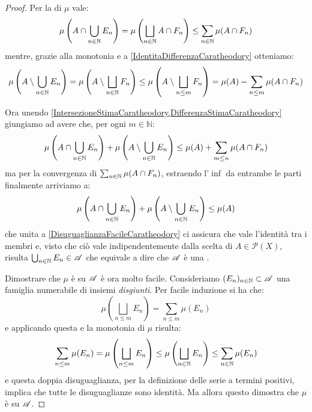 \begin{proof}
	Per la \sigsubadd[ità] di $\mu$ vale:
	\begin{equation}\label{IntersezioneStimaCaratheodory}
		\mu\left(A\cap\bigcup_{n\in\mathbb N} E_n\right)=\mu\left(\bigsqcup_{n\in\mathbb N} A\cap F_n\right)\le
		\sum_{n\in\mathbb N} \mu(A\cap F_n)
	\end{equation}
	mentre, grazie alla monotonia e a \cref{IdentitaDifferenzaCaratheodory} otteniamo:
	\begin{equation}\label{DifferenzaStimaCaratheodory}
		\mu\left(A\setminus\bigcup_{n\in\mathbb N} E_n\right) = \mu\left(A\setminus\bigsqcup_{n\in\mathbb N} F_n\right) \le \mu\left(A\setminus\bigsqcup_{n\le m} F_n\right) = 
		\mu(A)-\sum_{n\le m}\mu(A\cap F_n)
	\end{equation}
	
	Ora unendo \cref{IntersezioneStimaCaratheodory,DifferenzaStimaCaratheodory} giungiamo ad avere che, per ogni $m\in\mathbb{N}$:
	\begin{equation*}
		\mu\left(A\cap\bigcup_{n\in\mathbb N} E_n\right)+\mu\left(A\setminus\bigcup_{n\in\mathbb N} E_n\right)\le
		\mu(A)+\sum_{m\le n}\mu(A\cap F_n) 
	\end{equation*}
	ma per la convergenza di $\sum_{n\in \mathbb N}\mu(A\cap F_n)$, estraendo l'$\inf$ da entrambe le parti finalmente arriviamo a:
	\begin{equation*}
		\mu\left(A\cap\bigcup_{n\in\mathbb N} E_n\right)+\mu\left(A\setminus\bigcup_{n\in\mathbb N} E_n\right)\le
		\mu(A)
	\end{equation*}
	che unita a \cref{DisuguaglianzaFacileCaratheodory} ci assicura che vale l'identità tra i membri e, visto che ciò vale indipendentemente dalla scelta di $A\in\mathcal P(X)$, risulta $\bigcup_{n\in\mathbb N}E_n\in\mathscr A$ che equivale a dire che $\mathscr A$ è una \sigalg{}.
	
	Dimostrare che $\mu$ è \sigadd{} su $\mathscr A$ è ora molto facile.
	Consideriamo $(E_n)_{n\in\mathbb N}\subset \mathscr A$ una famiglia numerabile di insiemi \emph{disgiunti}. Per facile induzione si ha che:
	\begin{equation*}
		\mu\left(\bigsqcup_{n\le m}E_n\right)=\sum_{n\le m} \mu(E_n)
	\end{equation*}
	e applicando questa e la monotonia di $\mu$ risulta:
	\begin{equation*}
		\sum_{n\le m} \mu(E_n)=\mu\left(\bigsqcup_{n\le m}E_n\right)\le
		\mu\left(\bigsqcup_{n\in\mathbb N}E_n\right)\le \sum_{n\in\mathbb N} \mu(E_n)
	\end{equation*}
	e questa doppia disuguaglianza, per la definizione delle serie a termini positivi, implica che tutte le disuguaglianze sono identità. Ma allora questo dimostra che $\mu$ è \sigadd{} su $\mathscr A$.
	

\end{proof}
